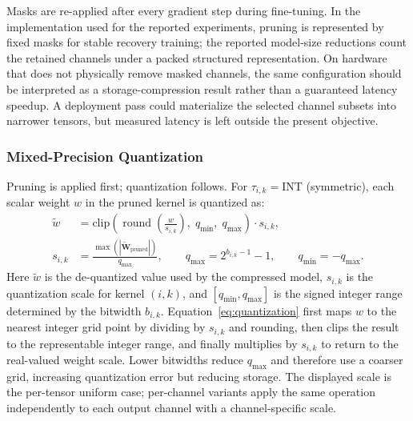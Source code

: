 \documentclass[preprint,12pt,authoryear]{elsarticle}
\begin{document}
\noindent Masks are re-applied after every gradient step during fine-tuning. In the
implementation used for the reported experiments, pruning is represented by fixed masks
for stable recovery training; the reported model-size reductions count the retained
channels under a packed structured representation. On hardware that does not physically
remove masked channels, the same configuration should be interpreted as a
storage-compression result rather than a guaranteed latency speedup. A deployment pass
could materialize the selected channel subsets into narrower tensors, but measured latency
is left outside the present objective.

\subsubsection{Mixed-Precision Quantization}

Pruning is applied first; quantization follows. For $\tau_{i,k} = \mathrm{INT}$
(symmetric), each scalar weight $w$ in the pruned kernel is quantized as:
\begin{equation}
\begin{aligned}
    \tilde{w} &=
    \mathrm{clip}\!\left(
        \operatorname{round}\!\left( \frac{w}{s_{i,k}} \right),\;
        q_{\min},\; q_{\max}
    \right) \cdot s_{i,k}, \\
    s_{i,k} &= \frac{\max(|\widetilde{\mathbf{W}}_{\mathrm{pruned}}|)}{q_{\max}},
    \qquad
    q_{\max} = 2^{b_{i,k}-1} - 1,
    \qquad
    q_{\min} = -q_{\max}.
\end{aligned}
    \label{eq:quantization}
\end{equation}
\noindent Here $\tilde{w}$ is the de-quantized value used by the compressed model,
$s_{i,k}$ is the quantization scale for kernel $(i,k)$, and
$[q_{\min},q_{\max}]$ is the signed integer range determined by the bitwidth
$b_{i,k}$. Equation~\eqref{eq:quantization} first maps $w$ to the nearest integer grid
point by dividing by $s_{i,k}$ and rounding, then clips the result to the representable
integer range, and finally multiplies by $s_{i,k}$ to return to the real-valued weight
scale. Lower bitwidths reduce $q_{\max}$ and therefore use a coarser grid, increasing
quantization error but reducing storage. The displayed scale is the per-tensor uniform
case; per-channel variants apply the same operation independently to each output channel
with a channel-specific scale.
\end{document}

